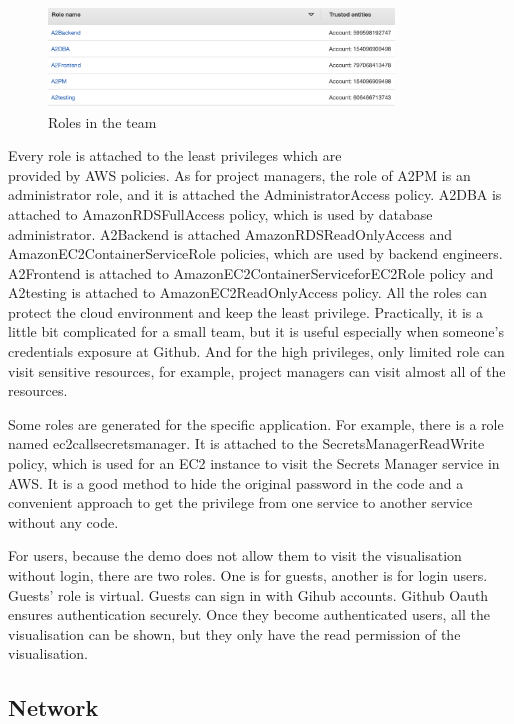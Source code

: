 \documentclass[conference]{IEEEtran}
\begin{document}
\begin{figure}[htbp]
    \centerline{\includegraphics[width=260pt]{images/roles.png}}
    \caption{Roles in the team}
    \label{roles}
\end{figure}

Every role is attached to the least privileges which are \\ provided by AWS policies. As for project managers, the role of A2PM is an administrator role, and it is 
attached the AdministratorAccess policy. A2DBA is attached to AmazonRDSFullAccess policy, which is used by database administrator. A2Backend is attached 
AmazonRDSReadOnlyAccess and AmazonEC2ContainerServiceRole policies, which are used by backend engineers. A2Frontend is attached to AmazonEC2ContainerServiceforEC2Role 
policy and A2testing is attached to AmazonEC2ReadOnlyAccess policy. All the roles can protect the cloud environment and keep the least privilege. Practically, it is 
a little bit complicated for a small team, but it is useful especially when someone's credentials exposure at Github. And for the high privileges, only 
limited role can visit sensitive resources, for example, project managers can visit almost all of the resources.

Some roles are generated for the specific application. For example, there is a role named ec2callsecretsmanager. It is attached to the SecretsManagerReadWrite 
policy, which is used for an EC2 instance to visit the Secrets Manager service in AWS. It is a good method to hide the original password in the code and a 
convenient approach to get the privilege from one service to another service without any code.

For users, because the demo does not allow them to visit the visualisation without login, there are two roles. One is for guests, another is for login users. 
Guests' role is virtual. Guests can sign in with Gihub accounts. Github Oauth ensures authentication securely. Once they become authenticated users, 
all the visualisation can be shown, but they only have the read permission of the visualisation.


\subsection{Network}
\end{document}
